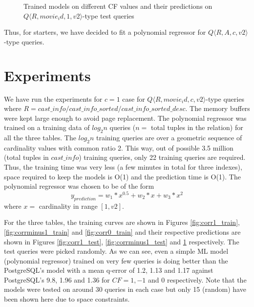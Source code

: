 \documentclass{article}
\begin{document}
\begin{figure}
\begin{subfigure}{.5\linewidth}
	\label{fig:corr0_test}
\end{subfigure}
\caption{Trained models on different CF values and their predictions on $Q \langle R,movie_id,1,v2 \rangle $-type test queries}
\label{index_performance}
\end{figure}
\newpage
\begin{multicols}{2}
	
Thus, for starters, we have decided to fit a polynomial regressor for $Q \langle R,A,c,v2 \rangle $-type queries.
\section{Experiments}
\label{sec:experiments}
We have run the experiments for $c = 1$ case for $Q \langle R,movie_id,c,v2 \rangle $-type queries where $R = cast\_info/cast\_info\_sorted/cast\_info\_sorted\_desc$. The memory buffers were kept large enough to avoid page replacement. The polynomial regressor was trained on a training data of $log_{2}n$ queries ($n =$ total tuples in the relation) for all the three tables. The $log_{2}n$ training queries are over a geometric sequence of cardinality values with common ratio 2. This way, out of possible 3.5 million (total tuples in $cast\_info$) training queries, only 22 training queries are required. Thus, the training time was very less (a few minutes in total for three indexes), space required to keep the models is O(1) and the prediction time is O(1). The polynomial regressor was chosen to be of the form
\[y_{prediction} = w_{1}*x^{0.5} + w_{2}*x + w_{3}*x^2\]
where $x = $ cardinality in range $[1,v2]$.

For the three tables, the training curves are shown in Figures \ref{fig:corr1_train}, \ref{fig:corrminus1_train} and \ref{fig:corr0_train} and their respective predictions are shown in Figures \ref{fig:corr1_test}, \ref{fig:corrminus1_test} and \ref{fig:corr0_test} respectively. The test queries were picked randomly. As we can see, even a simple ML model (polynomial regressor) trained on very few queries is doing better than the PostgreSQL's model with a mean q-error of 1.2, 1.13 and 1.17 against PostgreSQL's 9.8, 1.96 and 1.36 for $CF = 1, -1$ and $0$ respectively. Note that the models were tested on around 30 queries in each case but only 15 (random) have been shown here due to space constraints. %
\end{multicols}
\end{document}

